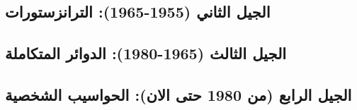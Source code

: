 \documentclass[document.tex]{subfiles}
\begin{document}
\subsection{الجيل الثاني (1955-1965): الترانزستورات}
\subsection{الجيل الثالث (1965-1980): الدوائر المتكاملة}
\subsection{الجيل الرابع (من 1980 حتى الان): الحواسيب الشخصية}

\end{document}
